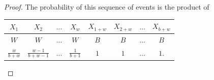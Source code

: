 \documentclass[12pt]{article}
\begin{document}
\begin{proof}
  The probability of this sequence of events is the product of

  \begin{tabular}{|c|c|c|c|c|c|c|c|}
    $X_1$& $X_2$    &                        $\ldots$& $X_w$              & $X_{1+w}$& $X_{2+w}$& $\ldots$& $X_{b+w}$\\
    \hline
    $W$             & $W$                  & $\ldots$& $W$                & $B$     & $B$     & $\ldots$& $B$\\
    $\frac{w}{b+w}$ & $\frac{w-1}{b+w-1}$  & $\ldots$& $\frac{1}{b + 1}$  & $1$     & $1$     & $\ldots$& $1$.
  \end{tabular}


\end{proof}








































\end{document}
